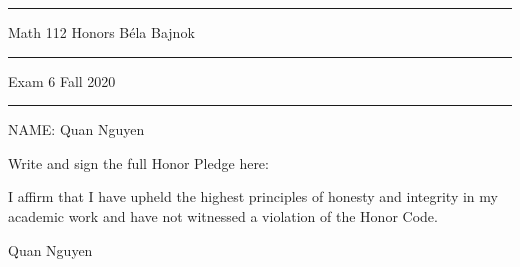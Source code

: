 \documentclass[12pt]{article}
\begin{document}
\hrule
\vspace{.2cm}

{\Large \noindent Math 112 Honors
\hfill
B\'ela Bajnok}

\vspace{.3cm}
\hrule

{\Large \noindent 
Exam 6
\hfill
Fall 2020}

\vspace{.3cm}
\hrule

\noindent NAME:  Quan Nguyen

\noindent \hrulefill\rule{0pt}{4pt}

\noindent Write and sign the full Honor Pledge here:

\vspace{2mm}

I affirm that I have upheld the highest principles of honesty and integrity in my academic work and have not witnessed a violation of the Honor Code. \par

Quan Nguyen

\vspace{8mm}

\noindent \hrulefill\rule{0pt}{4pt}

\end{document}
